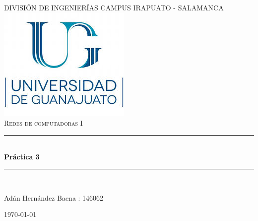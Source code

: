 \documentclass{article}
\begin{document}
\begin{titlepage}

\newcommand{\HRule}{\rule{\linewidth}{0.5mm}} %

\center %
 
 

\textsc{\large DIVISIÓN DE INGENIERÍAS CAMPUS IRAPUATO - SALAMANCA}\\[1.5cm] 
\includegraphics[scale=.8]{images/descarga.jpg}\\[1cm]  
\textsc{\Large Redes de computadoras I}\\[0.5cm]  
 

\HRule \\[.8cm]
\textbf{\bfseries Práctica 3}\\[0.4cm] %
\HRule \\[1.5cm]
 

 
\begin{center}
   \textcolor{night-blue}{Adán Hernández Baena : 146062\\}
\end{center}

\bigskip
    {\large \today}\\[2cm] %

\vfill %

\end{titlepage}

\newpage
\pagestyle{fancy}
\fancyhf{}
\rfoot{ \thepage} 
\newpage
\end{document}
